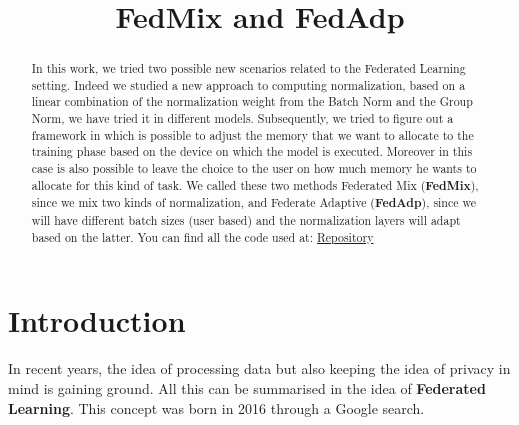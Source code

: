 \documentclass[conference]{IEEEtran}
\begin{document}
\title{FedMix and FedAdp\\
}

\author{
\and
{}
\and
{}
}

\maketitle
\thispagestyle{plain}
\pagestyle{plain}


\begin{abstract}
In this work, we tried two possible new scenarios related to the Federated Learning setting. Indeed we studied a new approach to computing normalization, based on a linear combination of the normalization weight from the Batch Norm and the Group Norm, we have tried it in different models. Subsequently, we tried to figure out a framework in which is possible to adjust the memory that we want to allocate to the training phase based on the device on which the model is executed. Moreover in this case is also possible to leave the choice to the user on how much memory he wants to allocate for this kind of task. We called these two methods Federated Mix (\textbf{FedMix}), since we mix two kinds of normalization, and Federate Adaptive (\textbf{FedAdp}), since we will have different batch sizes (user based) and the normalization layers will adapt based on the latter. You can find all the code used at: \href{https://github.com/LucaMarcellino/Federated-Mix-and-Federated-Adaptive}{Repository}
\end{abstract}


\section{Introduction}
In recent years, the idea of processing data but also keeping the idea of privacy in mind is gaining ground. All this can be summarised in the idea of \textbf{Federated Learning}. This concept was born in 2016 through a Google search.
\end{document}
